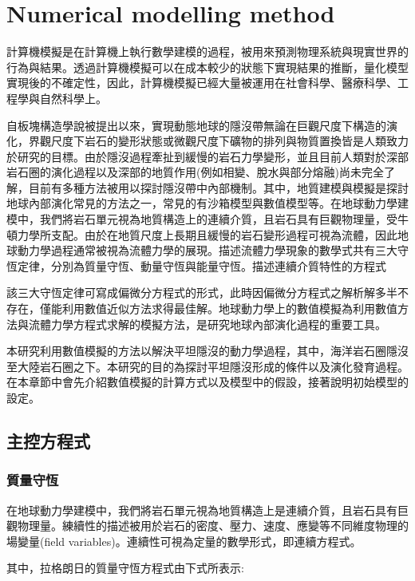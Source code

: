
\chapter{Numerical modelling method}


計算機模擬是在計算機上執行數學建模的過程，被用來預測物理系統與現實世界的行為與結果。透過計算機模擬可以在成本較少的狀態下實現結果的推斷，量化模型實現後的不確定性，因此，計算機模擬已經大量被運用在社會科學、醫療科學、工程學與自然科學上。

自板塊構造學說被提出以來，實現動態地球的隱沒帶無論在巨觀尺度下構造的演化，界觀尺度下岩石的變形狀態或微觀尺度下礦物的排列與物質置換皆是人類致力於研究的目標。由於隱沒過程牽扯到緩慢的岩石力學變形，並且目前人類對於深部岩石圈的演化過程以及深部的地質作用(例如相變、脫水與部分熔融)尚未完全了解，目前有多種方法被用以探討隱沒帶中內部機制。其中，地質建模與模擬是探討地球內部演化常見的方法之一，常見的有沙箱模型與數值模型等。在地球動力學建模中，我們將岩石單元視為地質構造上的連續介質，且岩石具有巨觀物理量，受牛頓力學所支配。由於在地質尺度上長期且緩慢的岩石變形過程可視為流體，因此地球動力學過程通常被視為流體力學的展現。描述流體力學現象的數學式共有三大守恆定律，分別為質量守恆、動量守恆與能量守恆。描述連續介質特性的方程式

該三大守恆定律可寫成偏微分方程式的形式，此時因偏微分方程式之解析解多半不存在，僅能利用數值近似方法求得最佳解。地球動力學上的數值模擬為利用數值方法與流體力學方程式求解的模擬方法，是研究地球內部演化過程的重要工具。

本研究利用數值模擬的方法以解決平坦隱沒的動力學過程，其中，海洋岩石圈隱沒至大陸岩石圈之下。本研究的目的為探討平坦隱沒形成的條件以及演化發育過程。在本章節中會先介紹數值模擬的計算方式以及模型中的假設，接著說明初始模型的設定。

\section{主控方程式}

\subsection{質量守恆}

在地球動力學建模中，我們將岩石單元視為地質構造上是連續介質，且岩石具有巨觀物理量。練續性的描述被用於岩石的密度、壓力、速度、應變等不同維度物理的場變量(field variables)。連續性可視為定量的數學形式，即連續方程式。

其中，拉格朗日的質量守恆方程式由下式所表示:

